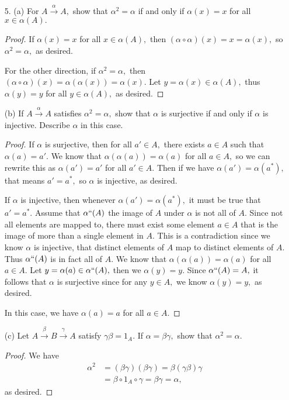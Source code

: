\documentclass{article}
\begin{document}
\begin{itemize}
	\item[5.]  (a) For $A\xrightarrow{\alpha}A,$ show that $\alpha^2=\alpha$ if and only if $\alpha(x)=x$ for all $x\in\alpha(A).$
		\begin{proof}
			If $\alpha(x)=x$ for all $x\in \alpha(A),$ then $(\alpha\circ\alpha)(x)=x=\alpha(x),$ so $\alpha^2=\alpha,$ as desired.

			For the other direction, if $\alpha^2=\alpha,$ then $(\alpha\circ\alpha)(x)=\alpha(\alpha(x))=\alpha(x).$ Let $y=\alpha(x)\in\alpha(A),$ thus $\alpha(y)=y$ for all $y\in\alpha(A),$ as desired. 

		\end{proof}

		(b) If $A\xrightarrow{\alpha}A$ satisfies $\alpha^2=\alpha,$ show that $\alpha$ is surjective if and only if $\alpha$ is injective. Describe $\alpha$ in this case.
			\begin{proof}
				If $\alpha$ is surjective, then for all $a'\in A,$ there exists $a\in A$ such that $\alpha(a)=a'.$ We know that $\alpha(\alpha(a))=\alpha(a)$ for all $a\in A,$ so we can rewrite this as $\alpha(a')=a'$ for all $a'\in A.$ Then if we have $\alpha(a')=\alpha(a^*),$ that means $a'=a^*,$ so $\alpha$ is injective, as desired.

			If $\alpha$ is injective, then whenever $\alpha(a')=\alpha(a^*),$ it must be true that $a'=a^*.$ Assume that $\alpha``(A)$ the image of $A$ under $\alpha$ is not all of $A.$ Since not all elements are mapped to, there must exist some element $a\in A$ that is the image of more than a single element in $A.$ This is a contradiction since we know $\alpha$ is injective, that distinct elements of $A$ map to distinct elements of $A.$ Thus $\alpha``(A)$ is in fact all of $A.$ We know that $\alpha(\alpha(a))=\alpha(a)$ for all $a\in A.$ Let $y=\alpha(a)\in \alpha``(A),$ then we $\alpha(y)=y.$ Since $\alpha``(A)=A,$ it follows that $\alpha$ is surjective since for any $y\in A,$ we know $\alpha(y)=y,$ as desired.

			In this case, we have $\alpha(a)=a$ for all $a\in A.$
			
			\end{proof}

			(c) Let $A\xrightarrow{\beta}B\xrightarrow{\gamma}A$ satisfy $\gamma\beta=1_A.$ If $\alpha=\beta\gamma,$ show that $\alpha^2=\alpha.$
			\begin{proof}
				We have
				\begin{align*}
					\alpha^2 &= (\beta\gamma)(\beta\gamma) = \beta(\gamma\beta)\gamma \\
					&= \beta\circ1_A\circ\gamma=\beta\gamma=\alpha,
				\end{align*} as desired.
			\end{proof}


\end{itemize}
\end{document}
